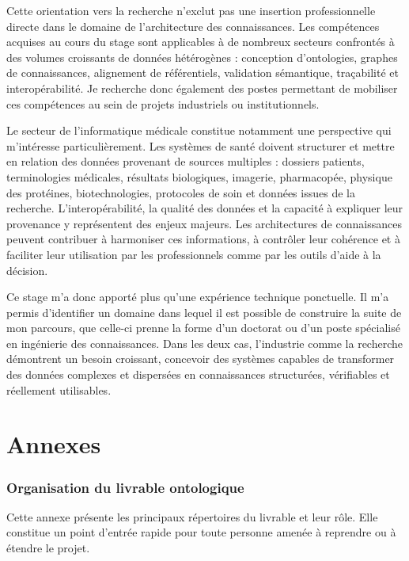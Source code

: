 \documentclass{article}
\begin{document}
Cette orientation vers la recherche n'exclut pas une insertion professionnelle directe dans le domaine de l'architecture des connaissances. Les compétences acquises au cours du stage sont applicables à de nombreux secteurs confrontés à des volumes croissants de données hétérogènes : conception d'ontologies, graphes de connaissances, alignement de référentiels, validation sémantique, traçabilité et interopérabilité. Je recherche donc également des postes permettant de mobiliser ces compétences au sein de projets industriels ou institutionnels.

Le secteur de l'informatique médicale constitue notamment une perspective qui m'intéresse particulièrement. Les systèmes de santé doivent structurer et mettre en relation des données provenant de sources multiples : dossiers patients, terminologies médicales, résultats biologiques, imagerie, pharmacopée, physique des protéines, biotechnologies, protocoles de soin et données issues de la recherche. L'interopérabilité, la qualité des données et la capacité à expliquer leur provenance y représentent des enjeux majeurs. Les architectures de connaissances peuvent contribuer à harmoniser ces informations, à contrôler leur cohérence et à faciliter leur utilisation par les professionnels comme par les outils d'aide à la décision.

Ce stage m'a donc apporté plus qu'une expérience technique ponctuelle. Il m'a permis d'identifier un domaine dans lequel il est possible de construire la suite de mon parcours, que celle-ci prenne la forme d'un doctorat ou d'un poste spécialisé en ingénierie des connaissances. Dans les deux cas, l'industrie comme la recherche démontrent un besoin croissant, concevoir des systèmes capables de transformer des données complexes et dispersées en connaissances structurées, vérifiables et réellement utilisables.

\clearpage
\appendix

\part*{Annexes}
\clearpage

\section{Organisation du livrable ontologique}

Cette annexe présente les principaux répertoires du livrable et leur rôle. Elle constitue un point d'entrée rapide pour toute personne amenée à reprendre ou à étendre le projet.
\end{document}
